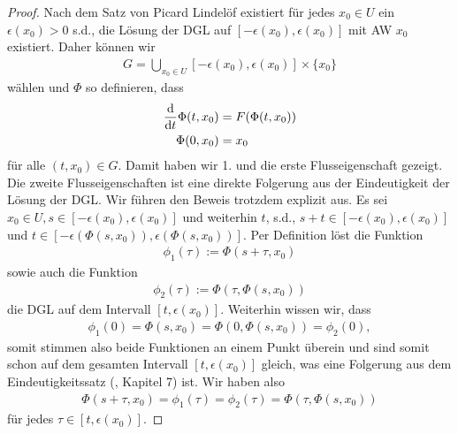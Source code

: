 \begin{proof}
 Nach dem Satz von Picard Lindelöf existiert für jedes \(x_0\in U\) ein \(\epsilon(x_0)>0\) s.d., die Lösung der DGL
auf \([-\epsilon(x_0),\epsilon(x_0)]\) mit AW \(x_0\) existiert. Daher können wir
\begin{align*}
G = \bigcup_{x_0\in U} [-\epsilon(x_0),\epsilon(x_0)] \times\{x_0\}
\end{align*}
wählen und \(\Phi\) so definieren, dass
\begin{align*}
\frac{\mathrm{d}}{\mathrm{d} t} \Phi(t, x_0) &= F(\Phi(t, x_0))\\
\Phi(0, x_0) &= x_0
\end{align*}
für alle \((t, x_0)\in G\). Damit haben wir 1. und die erste Flusseigenschaft gezeigt. Die zweite Flusseigenschaften ist eine direkte Folgerung aus der Eindeutigkeit der Lösung der DGL. Wir führen den Beweis trotzdem explizit aus. Es sei \(x_0\in U, s\in [-\epsilon(x_0), \epsilon(x_0)]\) und weiterhin \(t\), s.d., \(s+t \in [-\epsilon(x_0), \epsilon(x_0)]\) und \(t\in [-\epsilon(\Phi(s,x_0)), \epsilon(\Phi(s,x_0))]\).
Per Definition löst die Funktion
\begin{align*}
\phi_1(\tau) := \Phi(s + \tau, x_0)
\end{align*}
sowie auch die Funktion
\begin{align*}
\phi_2(\tau) := \Phi(\tau, \Phi(s,x_0))
\end{align*}
die DGL auf dem Intervall \([t, \epsilon(x_0)]\). Weiterhin wissen wir, dass
\begin{align*}
\phi_1(0) = \Phi(s, x_0) = \Phi(0, \Phi(s, x_0)) = \phi_2(0),
\end{align*}
somit stimmen also beide Funktionen an einem Punkt überein und sind somit schon auf dem gesamten Intervall \([t, \epsilon(x_0)]\) gleich, was
eine Folgerung aus dem Eindeutigkeitssatz (\cite{Ten21}, Kapitel 7) ist. Wir haben also
\begin{align*}
\Phi(s + \tau, x_0) = \phi_1(\tau) = \phi_2(\tau) = \Phi(\tau, \Phi(s,x_0))
\end{align*}
für jedes \(\tau\in [t, \epsilon(x_0)]\).
\end{proof}


